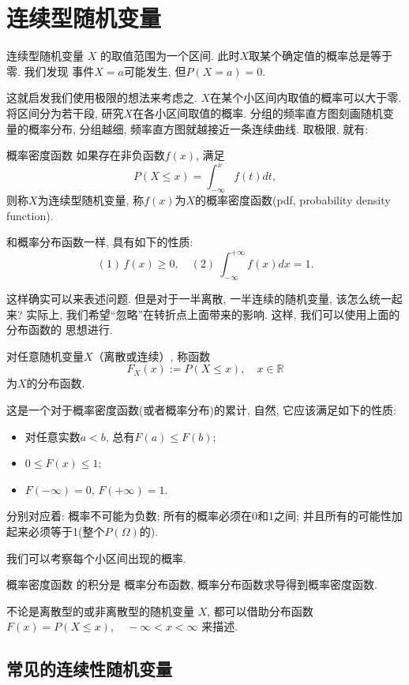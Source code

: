 \section{连续型随机变量}
连续型随机变量 $X$ 的取值范围为一个区间. 此时$X$取某个确定值的概率总是等于零. 我们发现
事件$X=a$可能发生, 但$P(X=a)=0$. 

这就启发我们使用极限的想法来考虑之. $X$在某个小区间内取值的概率可以大于零. 
将区间分为若干段, 研究$X$在各小区间取值的概率. 分组的频率直方图刻画随机变量的概率分布,
分组越细, 频率直方图就越接近一条连续曲线. 取极限, 就有:

\begin{definition}{概率密度函数}
    如果存在非负函数$f(x)$, 满足
    $$
        P(X\leq x)=\int_{-\infty}^{x}f(t)dt,
    $$
    则称$X$为连续型随机变量, 称$f(x)$为$X$的概率密度函数(pdf, probability density function).
\end{definition}

和概率分布函数一样, 具有如下的性质:
$$
    (1)\,f(x)\ge 0,\quad (2)\ \int_{-\infty}^{+\infty}f(x)dx=1.
$$

这样确实可以来表述问题. 但是对于一半离散, 一半连续的随机变量, 该怎么统一起来?
实际上, 我们希望``忽略''在转折点上面带来的影响. 这样, 我们可以使用上面的分布函数的
思想进行.

\begin{definition}
    对任意随机变量$X$（离散或连续）, 称函数
    $$F_X(x):=P(X\le x),\quad x\in \mathbb{R}$$
    为$X$的分布函数. 
\end{definition}
这是一个对于概率密度函数(或者概率分布)的累计, 自然, 它应该满足如下的性质:

\begin{itemize}
    \item 对任意实数$a<b$, 总有$F(a)\le F(b)$;
    \item $0 \le F(x) \le 1$; 
    \item $F(-\infty)=0$, $F(+\infty)=1$. 
\end{itemize}
分别对应着: 概率不可能为负数; 所有的概率必须在0和1之间; 并且所有的可能性加起来必须等于1(整个$P(\Omega)$的).
\begin{takeaway}
    我们可以考察每个小区间出现的概率.

    概率密度函数 的积分是 概率分布函数, 概率分布函数求导得到概率密度函数.

    不论是离散型的或非离散型的随机变量 $X$, 都可以借助分布函数$F(x)=P(X \leq x), \quad-\infty<x<\infty$
    来描述.
\end{takeaway}
\subsection{常见的连续性随机变量}


